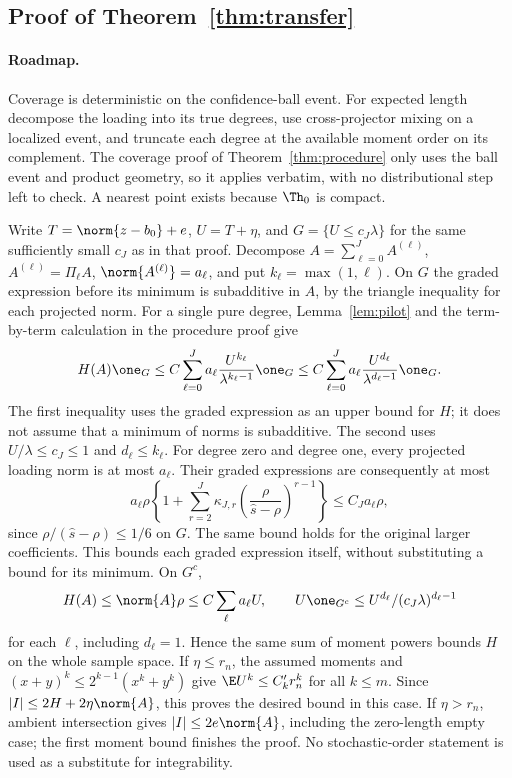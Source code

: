 \subsection{Proof of Theorem~\ref{thm:transfer}}
\paragraph{Roadmap.} Coverage is deterministic on the confidence-ball event. For expected length decompose the loading into its true degrees, use cross-projector mixing on a localized event, and truncate each degree at the available moment order on its complement.
The coverage proof of Theorem~\ref{thm:procedure} only uses the ball event and product geometry, so it applies verbatim, with no distributional step left to check. A nearest point exists because $\Th_0$ is compact.

Write $T=\norm{z-b_0}+e$, $U=T+\eta$, and $G=\{U\le c_J\lambda\}$ for the same sufficiently small $c_J$ as in that proof. Decompose $A=\sum_{\ell=0}^J A^{(\ell)}$, $A^{(\ell)}=\Pi_\ell A$, $\norm{A^{(\ell)}}=a_\ell$, and put $k_\ell=\max(1,\ell)$. On $G$ the graded expression before its minimum is subadditive in $A$, by the triangle inequality for each projected norm. For a single pure degree, Lemma~\ref{lem:pilot} and the term-by-term calculation in the procedure proof give
\[
 H(A)\one_G\le C\sum_{\ell=0}^J a_\ell
           \frac{U^{k_\ell}}{\lambda^{k_\ell-1}}\one_G
 \le C\sum_{\ell=0}^J a_\ell
           \frac{U^{d_\ell}}{\lambda^{d_\ell-1}}\one_G.
\]
The first inequality uses the graded expression as an upper bound for $H$; it does not assume that a minimum of norms is subadditive. The second uses $U/\lambda\le c_J\le1$ and $d_\ell\le k_\ell$. For degree zero and degree one, every projected loading norm is at most $a_\ell$. Their graded expressions are consequently at most
\[
 a_\ell\rho\left\{1+\sum_{r=2}^J\kappa_{J,r}
       \left(\frac{\rho}{\widehat s-\rho}\right)^{r-1}\right\}
 \le C_Ja_\ell\rho,
\]
since $\rho/(\widehat s-\rho)\le1/6$ on $G$. The same bound holds for the original larger coefficients. This bounds each graded expression itself, without substituting a bound for its minimum. On $G^c$,
\[
 H(A)\le\norm{A}\rho\le C\sum_\ell a_\ell U,
 \qquad U\one_{G^c}\le
        U^{d_\ell}/(c_J\lambda)^{d_\ell-1}
\]
for each $\ell$, including $d_\ell=1$. Hence the same sum of moment powers bounds $H$ on the whole sample space. If $\eta\le r_n$, the assumed moments and $(x+y)^k\le2^{k-1}(x^k+y^k)$ give $\E U^k\le C'_k r_n^k$ for all $k\le m$. Since $|I|\le2H+2\eta\norm{A}$, this proves the desired bound in this case. If $\eta>r_n$, ambient intersection gives $|I|\le2e\norm{A}$, including the zero-length empty case; the first moment bound finishes the proof. No stochastic-order statement is used as a substitute for integrability.

